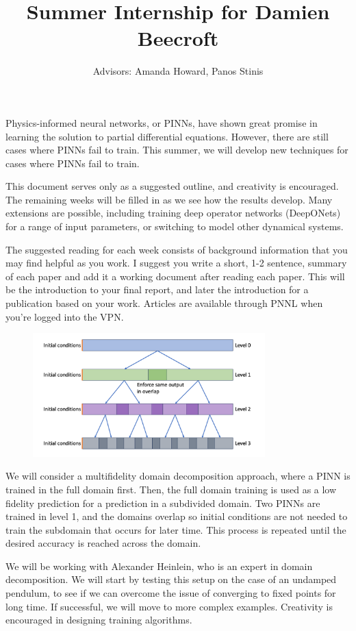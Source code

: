 \documentclass{article}
\title{Summer Internship for Damien Beecroft}
\author{Advisors: Amanda Howard, Panos Stinis}
\begin{document}
\maketitle
Physics-informed neural networks, or PINNs, have shown great promise in learning the solution to partial differential equations. However, there are still cases where PINNs fail to train. This summer, we will develop new techniques for cases where PINNs fail to train.
\par This document serves only as a suggested outline, and creativity is encouraged. The remaining weeks will be filled in as we see how the results develop. Many extensions are possible, including training deep operator networks (DeepONets) for a range of input parameters, or switching to model other dynamical systems. 
\par The suggested reading for each week consists of background information that you may find helpful as you work. I suggest you write a short, 1-2 sentence, summary of each paper and add it a working document after reading each paper. This will be the introduction to your final report, and later the introduction for a publication based on your work. Articles are available through PNNL when you’re logged into the VPN.
\begin{figure}[H]
\center
\includegraphics[width=0.8\textwidth]{imgs/domain_decomp}
\end{figure}
We will consider a multifidelity domain decomposition approach, where a PINN is trained in the full domain first. Then, the full domain training is used as a low fidelity prediction for a prediction in a subdivided domain. Two PINNs are trained in level 1, and the domains overlap so initial conditions are not needed to train the subdomain that occurs for later time. This process is repeated until the desired accuracy is reached across the domain.  
\par We will be working with Alexander Heinlein, who is an expert in domain decomposition. We will start by testing this setup on the case of an undamped pendulum, to see if we can overcome the issue of converging to fixed points for long time. If successful, we will move to more complex examples. Creativity is encouraged in designing training algorithms. 
\newpage
\end{document}
